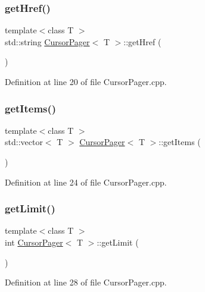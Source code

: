 \subsubsection{\texorpdfstring{get\+Href()}{getHref()}}
{\footnotesize\ttfamily template$<$class T $>$ \\
std\+::string \mbox{\hyperlink{class_cursor_pager}{Cursor\+Pager}}$<$ T $>$\+::get\+Href (\begin{DoxyParamCaption}{ }\end{DoxyParamCaption})}



Definition at line 20 of file Cursor\+Pager.\+cpp.

\mbox{\label{class_cursor_pager_a88246cd3876108a6483c10726d6f5682}} 
\subsubsection{\texorpdfstring{get\+Items()}{getItems()}}
{\footnotesize\ttfamily template$<$class T $>$ \\
std\+::vector$<$ T $>$ \mbox{\hyperlink{class_cursor_pager}{Cursor\+Pager}}$<$ T $>$\+::get\+Items (\begin{DoxyParamCaption}{ }\end{DoxyParamCaption})}



Definition at line 24 of file Cursor\+Pager.\+cpp.

\mbox{\label{class_cursor_pager_a86d6a130611f6f35bc161a4bba7edba3}} 
\subsubsection{\texorpdfstring{get\+Limit()}{getLimit()}}
{\footnotesize\ttfamily template$<$class T $>$ \\
int \mbox{\hyperlink{class_cursor_pager}{Cursor\+Pager}}$<$ T $>$\+::get\+Limit (\begin{DoxyParamCaption}{ }\end{DoxyParamCaption})}



Definition at line 28 of file Cursor\+Pager.\+cpp.

